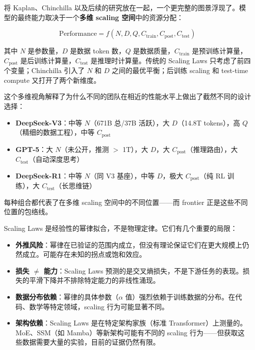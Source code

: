 将 Kaplan、Chinchilla 以及后续的研究放在一起，一个更完整的图景浮现了。模型的最终能力取决于一个\textbf{多维 scaling 空间}中的资源分配：

\begin{equation}
  \text{Performance} = f(N, D, Q, C_{\text{train}}, C_{\text{post}}, C_{\text{test}})
\end{equation}

其中 $N$ 是参数量，$D$ 是数据 token 数，$Q$ 是数据质量，$C_{\text{train}}$ 是预训练计算量，$C_{\text{post}}$ 是后训练计算量，$C_{\text{test}}$ 是推理时计算量。传统的 Scaling Laws 只考虑了前四个变量；Chinchilla 引入了 $N$ 和 $D$ 之间的最优平衡；后训练 scaling 和 test-time compute 又打开了两个新维度。

这个多维视角解释了为什么不同的团队在相近的性能水平上做出了截然不同的设计选择：
\begin{itemize}[noitemsep]
  \item \textbf{DeepSeek-V3}：中等 $N$（671B 总/37B 活跃），大 $D$（14.8T tokens），高 $Q$（精细的数据工程），中等 $C_{\text{post}}$
  \item \textbf{GPT-5}：大 $N$（未公开，推测 $>$ 1T），大 $D$，大 $C_{\text{post}}$（推理路由），大 $C_{\text{test}}$（自动深度思考）
  \item \textbf{DeepSeek-R1}：中等 $N$（同 V3 基座），中等 $D$，极大 $C_{\text{post}}$（纯 RL 训练），大 $C_{\text{test}}$（长思维链）
\end{itemize}

每种组合都代表了在多维 scaling 空间中的不同位置——而 frontier 正是这些不同位置的包络线。

\begin{warnbox}
Scaling Laws 是经验性的幂律拟合，不是物理定律。它们有几个重要的局限：
\begin{itemize}[noitemsep]
  \item \textbf{外推风险}：幂律在已验证的范围内成立，但没有理论保证它们在更大规模上仍然成立。可能存在未知的拐点或饱和效应。
  \item \textbf{损失 $\neq$ 能力}：Scaling Laws 预测的是交叉熵损失，不是下游任务的表现。损失的平滑下降并不排除特定能力的非线性涌现。
  \item \textbf{数据分布依赖}：幂律的具体参数（$\alpha$ 值）强烈依赖于训练数据的分布。在代码、数学等特定领域，scaling 行为可能显著不同。
  \item \textbf{架构依赖}：Scaling Laws 是在特定架构家族（标准 Transformer）上测量的。MoE、SSM（如 Mamba）等新架构可能有不同的 scaling 行为——但获取这些数据需要大量的实验，目前的证据仍然有限。
\end{itemize}
\end{warnbox}

